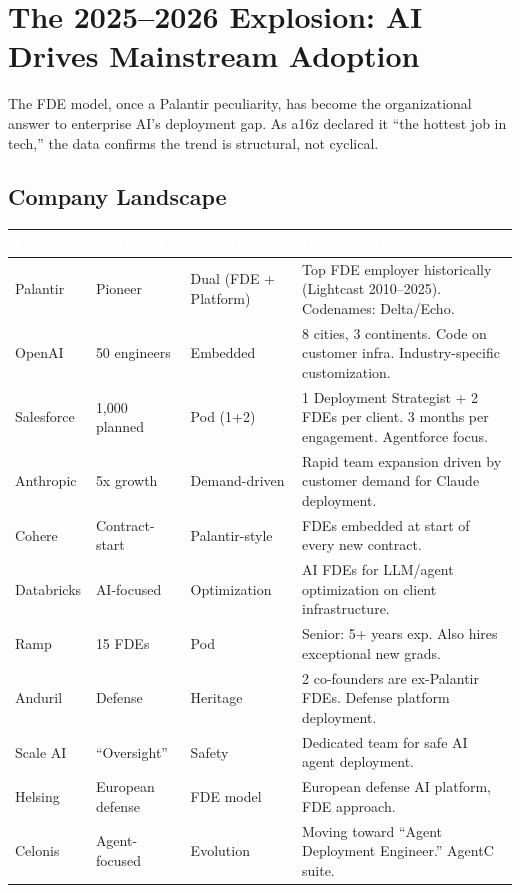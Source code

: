 \section{The 2025--2026 Explosion: AI Drives Mainstream Adoption}

The FDE model, once a Palantir peculiarity, has become the organizational
answer to enterprise AI's deployment gap. As a16z declared it ``the
hottest job in tech,'' the data confirms the trend is structural, not
cyclical.

\subsection{Company Landscape}

\begin{center}
\small
\begin{tabular}{L{2.2cm}L{2.2cm}L{2.2cm}L{6cm}}
\toprule
{}
\textcolor{white}{\textbf{Company}} &
\textcolor{white}{\textbf{FDE Scale}} &
\textcolor{white}{\textbf{Model}} &
\textcolor{white}{\textbf{Key Details}} \\
\midrule
Palantir &
    Pioneer &
    Dual (FDE + Platform) &
    Top FDE employer historically (Lightcast 2010--2025).
    Codenames: Delta/Echo. \\
OpenAI &
    \raisebox{-0.5ex}{\texttildelow}50 engineers &
    Embedded &
    8 cities, 3 continents. Code on customer infra.
    Industry-specific customization. \\
Salesforce &
    1,000 planned &
    Pod (1+2) &
    1 Deployment Strategist + 2 FDEs per client.
    \raisebox{-0.5ex}{\texttildelow}3 months per engagement.
    Agentforce focus. \\
Anthropic &
    5x growth &
    Demand-driven &
    Rapid team expansion driven by customer demand
    for Claude deployment. \\
Cohere &
    Contract-start &
    Palantir-style &
    FDEs embedded at start of every new contract. \\
Databricks &
    AI-focused &
    Optimization &
    AI FDEs for LLM/agent optimization on client
    infrastructure. \\
Ramp &
    \raisebox{-0.5ex}{\texttildelow}15 FDEs &
    Pod &
    Senior: 5+ years exp. Also hires exceptional
    new grads. \\
Anduril &
    Defense &
    Heritage &
    2 co-founders are ex-Palantir FDEs. Defense
    platform deployment. \\
Scale AI &
    ``Oversight'' &
    Safety &
    Dedicated team for safe AI agent deployment. \\
Helsing &
    European defense &
    FDE model &
    European defense AI platform, FDE approach. \\
Celonis &
    Agent-focused &
    Evolution &
    Moving toward ``Agent Deployment Engineer.''
    AgentC suite. \\
\bottomrule
\end{tabular}
\end{center}

